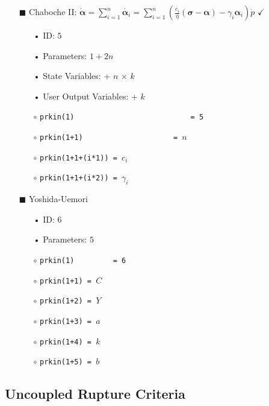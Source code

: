 \documentclass[11pt,a4paper,twoside,final,onecolumn,titlepage]{article}
\newcommand{\verified}{\hspace{0.5pt} {\LARGE $\checkmark$}}
\begin{document}
\pagebreak
\begin{itemize}
	\item[\tiny$\blacksquare$] Chaboche II: $\displaystyle \dot{\bm{\alpha}}=\sum_{i=1}^{n}\dot{\bm{\alpha}_i}=\sum_{i=1}^{n}\left(\frac{c_i}{\bar{\eta}}\left(\bm{\sigma}-\bm{\alpha}\right)-\gamma_{i}\bm{\alpha}_i\right)\dot{p}$ \verified{}
	\begin{itemize}
		\item[•] ID: $5$
		\item[•] Parameters: $1+2n$
		\item[•] State Variables: + $n$ $\times$ $k$
		\item[•] User Output Variables: + $k$\\
		\item[$\circ$] \texttt{prkin(1)\,\,\,\,\,\,\,\,\,\,\,\,\,\,\,\,\,\,\,\,\,\,\,\,\,\,\,= 5}
		\item[$\circ$] \texttt{prkin(1+1)\,\,\,\,\,\,\,\,\,\,\,\,\,\,\,\,\,\,\,\,\,= $n$}
		\item[$\circ$] \texttt{prkin(1+1+(i*1)) = $c_i$}
		\item[$\circ$] \texttt{prkin(1+1+(i*2)) = $\gamma_i$}\\
	\end{itemize}
\end{itemize}

\begin{itemize}
	\item[\tiny$\blacksquare$] Yoshida-Uemori %
	\begin{itemize}
		\item[•] ID: $6$
		\item[•] Parameters: $5$\\
		\item[$\circ$] \texttt{prkin(1)\,\,\,\,\,\,\,\,\,= 6}
		\item[$\circ$] \texttt{prkin(1+1) = $C$}
		\item[$\circ$] \texttt{prkin(1+2) = $Y$}
		\item[$\circ$] \texttt{prkin(1+3) = $a$}
		\item[$\circ$] \texttt{prkin(1+4) = $k$}
		\item[$\circ$] \texttt{prkin(1+5) = $b$}
	\end{itemize}
\end{itemize}

\vspace{0.2cm}
\subsection{Uncoupled Rupture Criteria}
\vspace{0.2cm}
\end{document}
